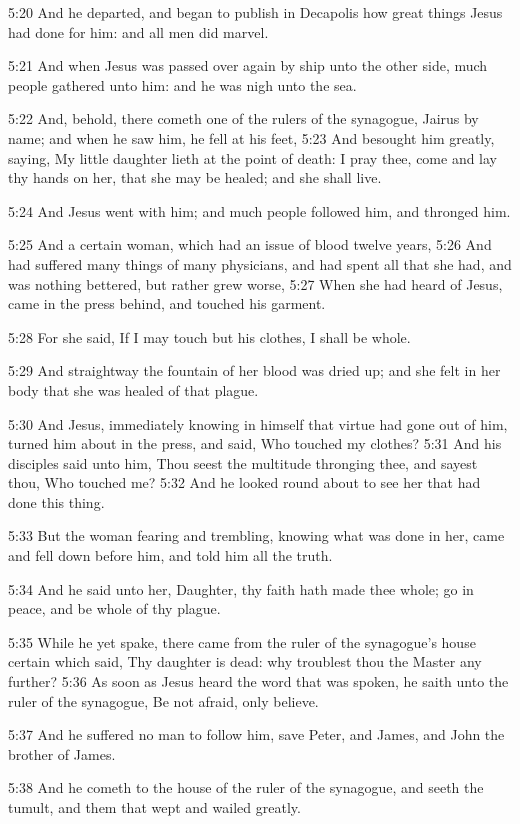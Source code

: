 5:20 And he departed, and began to publish in Decapolis how great things Jesus had done for him: and all men did marvel.

5:21 And when Jesus was passed over again by ship unto the other side, much people gathered unto him: and he was nigh unto the sea.

5:22 And, behold, there cometh one of the rulers of the synagogue, Jairus by name; and when he saw him, he fell at his feet, 5:23 And besought him greatly, saying, My little daughter lieth at the point of death: I pray thee, come and lay thy hands on her, that she may be healed; and she shall live.

5:24 And Jesus went with him; and much people followed him, and thronged him.

5:25 And a certain woman, which had an issue of blood twelve years, 5:26 And had suffered many things of many physicians, and had spent all that she had, and was nothing bettered, but rather grew worse, 5:27 When she had heard of Jesus, came in the press behind, and touched his garment.

5:28 For she said, If I may touch but his clothes, I shall be whole.

5:29 And straightway the fountain of her blood was dried up; and she felt in her body that she was healed of that plague.

5:30 And Jesus, immediately knowing in himself that virtue had gone out of him, turned him about in the press, and said, Who touched my clothes?  5:31 And his disciples said unto him, Thou seest the multitude thronging thee, and sayest thou, Who touched me?  5:32 And he looked round about to see her that had done this thing.

5:33 But the woman fearing and trembling, knowing what was done in her, came and fell down before him, and told him all the truth.

5:34 And he said unto her, Daughter, thy faith hath made thee whole; go in peace, and be whole of thy plague.

5:35 While he yet spake, there came from the ruler of the synagogue's house certain which said, Thy daughter is dead: why troublest thou the Master any further?  5:36 As soon as Jesus heard the word that was spoken, he saith unto the ruler of the synagogue, Be not afraid, only believe.

5:37 And he suffered no man to follow him, save Peter, and James, and John the brother of James.

5:38 And he cometh to the house of the ruler of the synagogue, and seeth the tumult, and them that wept and wailed greatly.

